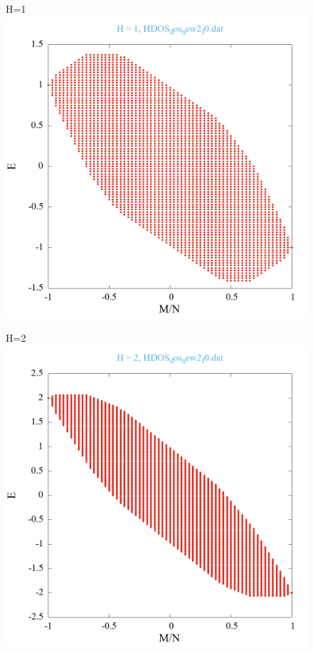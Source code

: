 \documentclass[utf8, babel, sor, jor, amsmath, amssymb, reprint]{elsarticle} %
\begin{document}
\begin{figure}[H]
\begin{minipage}[h]{0.45\linewidth}
	\end{minipage}
	\vfill
	\begin{minipage}[h]{0.45\linewidth}
		\centering H=1
		\includegraphics[width=1\linewidth]{pictures/HDOS_SI_64_J0_H1.png}
	\end{minipage}
	\hfill
	\begin{minipage}[h]{0.45\linewidth}
		\centering H=2
		\includegraphics[width=1\linewidth]{pictures/HDOS_SI_64_J0_H2.png}

\end{minipage}
\end{figure}
\end{document}
